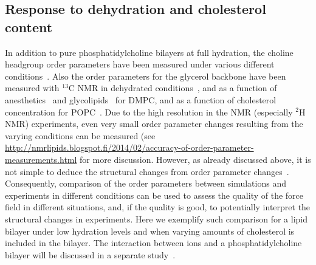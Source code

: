 \documentclass[pre,aps,floatfix,authordate1-4,twocolumn]{revtex4-1}
\begin{document}
\subsection{Response to dehydration and cholesterol content}
In addition to pure phosphatidylcholine bilayers at full hydration, the choline headgroup order parameters
have been measured under various different conditions~\cite{gally75,brown77,brown78,akutsu81,altenbach84,scherer89,bechinger91,ulrich94,dvinskikh05b,castro08,kapla12,ferreira13}.
Also the order parameters for the glycerol backbone have been measured with $^{13}$C NMR in dehydrated conditions~\cite{dvinskikh05b}, and as a function 
of anesthetics~\cite{castro08} and glycolipids~\cite{kapla12} for DMPC, and as a function of cholesterol 
concentration for POPC~\cite{ferreira13}. Due to the high resolution in the NMR (especially $^2$H NMR) experiments,
even very small order parameter changes resulting from the varying conditions can be measured (see
\url{http://nmrlipids.blogspot.fi/2014/02/accuracy-of-order-parameter-measurements.html}
for more discussion.
However, as already discussed above, it is not simple to deduce 
the structural changes from order parameter changes~\cite{akutsu91,semchyschyn04}. Consequently, comparison of the order parameters
between simulations and experiments in different conditions can be used to assess the quality of the force field 
in different situations, and, if the quality is good, to potentially interpret the structural changes in experiments.
Here we exemplify such comparison for a lipid bilayer under low hydration levels and when varying amounts of cholesterol is included in the bilayer. 
The interaction between ions and a phosphatidylcholine bilayer will be discussed in a separate study~\cite{ionpaper}.
\end{document}
